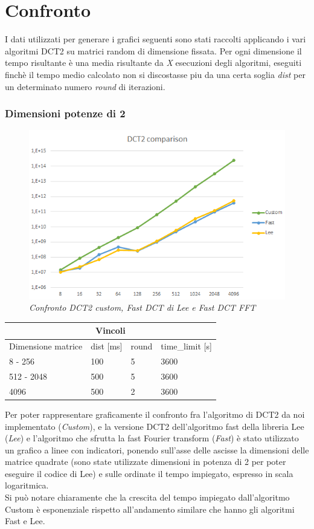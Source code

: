 \documentclass[a4paper,12pt]{report}
\begin{document}
\section{Confronto}
I dati utilizzati per generare i grafici seguenti sono stati raccolti applicando i vari algoritmi DCT2 su matrici random di dimensione fissata. Per ogni dimensione il tempo risultante è una media risultante da \textit{X} esecuzioni degli algoritmi, eseguiti finchè il tempo medio calcolato non si discostasse piu da una certa soglia \textit{dist} per un determinato numero \textit{round} di iterazioni.

\subsubsection*{Dimensioni potenze di 2}
\begin{figure}[H]
\centering
\includegraphics[width=0.77\linewidth]{../img/comparison.png}
\caption{\textit{Confronto DCT2 custom, Fast DCT di Lee e Fast DCT FFT}}
\end{figure}
\begin{center}
	\begin{tabular}{ |p{4cm}||p{2cm}|p{2cm}|p{2.5cm}|  }
		\hline
		\multicolumn{4}{|c|}{Vincoli} \\
		\hline
		Dimensione matrice& dist [ms] & round & time\_limit [s]\\
		\hline
		8 - 256   & 100    &5&   3600\\
		512 - 2048&   500  & 5   &3600\\
		4096 &500 & 2&  3600\\
		\hline
	\end{tabular}
\end{center}
\hfill \break
\hfill \break
Per poter rappresentare graficamente il confronto fra l'algoritmo di DCT2 da noi implementato (\textit{Custom}), e la versione DCT2 dell'algoritmo fast della libreria Lee (\textit{Lee}) e l'algoritmo che sfrutta la fast Fourier transform (\textit{Fast}) è stato utilizzato un grafico a linee con indicatori, ponendo sull'asse delle ascisse la dimensioni delle matrice quadrate (sono state utilizzate dimensioni in potenza di 2 per poter eseguire il codice di Lee) e sulle ordinate il tempo impiegato, espresso in scala logaritmica. \\
Si può notare chiaramente che la crescita del tempo impiegato dall'algoritmo Custom è esponenziale rispetto all'andamento similare che hanno gli algoritmi Fast e Lee. 
\end{document}
